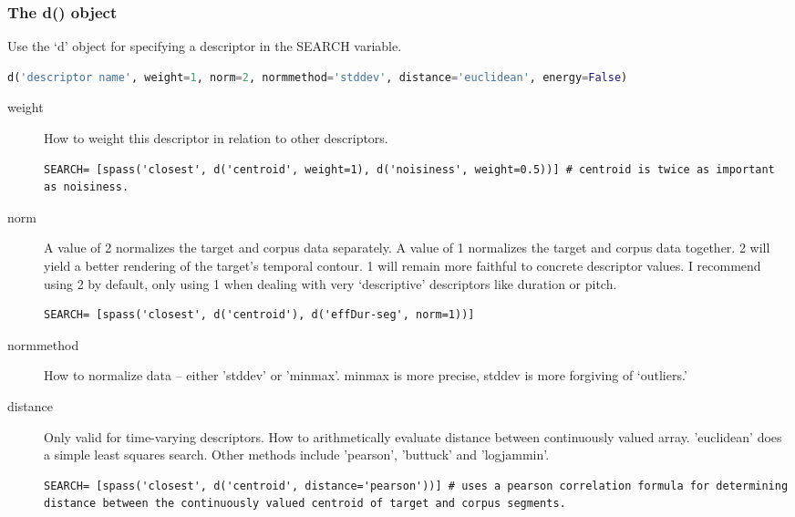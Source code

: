 \documentclass{article}
\begin{document}
\begin{spacing}{1.2}
\subsubsection{The d() object}
Use the `d' object for specifying a descriptor in the SEARCH variable.

 \begin{lstlisting}[language=python]
d('descriptor name', weight=1, norm=2, normmethod='stddev', distance='euclidean', energy=False)
\end{lstlisting}
 
\begin{description}

\item[weight] How to weight this descriptor in relation to other descriptors.

\begin{lstlisting}
SEARCH= [spass('closest', d('centroid', weight=1), d('noisiness', weight=0.5))] # centroid is twice as important as noisiness.
\end{lstlisting}

\item[norm] A value of 2 normalizes the target and corpus data separately.  A value of 1 normalizes the target and corpus data together.  2 will yield a better rendering of the target's temporal contour.  1 will remain more faithful to concrete descriptor values.  I recommend using 2 by default, only using 1 when dealing with very `descriptive' descriptors like duration or pitch.

\begin{lstlisting}
SEARCH= [spass('closest', d('centroid'), d('effDur-seg', norm=1))]
\end{lstlisting}

\item[normmethod] How to normalize data -- either 'stddev' or 'minmax'.  minmax is more precise, stddev is more forgiving of `outliers.'

\item[distance] Only valid for time-varying descriptors.  How to arithmetically evaluate distance between continuously valued array.  'euclidean' does a simple least squares search.  Other methods include 'pearson', 'buttuck' and 'logjammin'.

\begin{lstlisting}
SEARCH= [spass('closest', d('centroid', distance='pearson'))] # uses a pearson correlation formula for determining distance between the continuously valued centroid of target and corpus segments.
\end{lstlisting}


\end{description}
\end{spacing}
\end{document}
